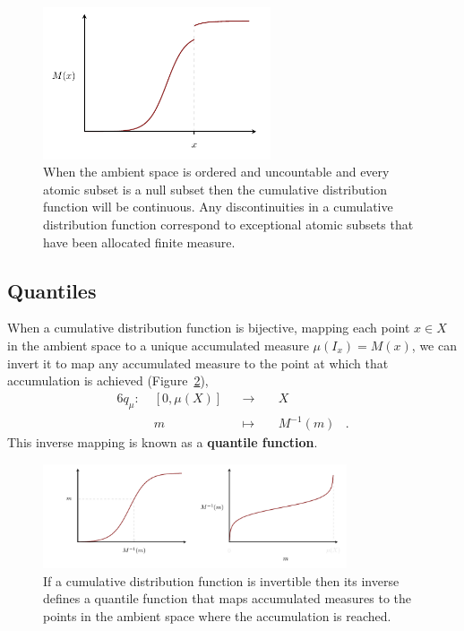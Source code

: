 \documentclass[
  letterpaper,
  DIV=11,
  numbers=noendperiod]{scrartcl}
\begin{document}
\begin{figure}

{\centering \includegraphics[width=0.6\textwidth,height=\textheight]{figures/cdfs/jump/jump.pdf}

}

\caption{\label{fig-cdf-jump}When the ambient space is ordered and
uncountable and every atomic subset is a null subset then the cumulative
distribution function will be continuous. Any discontinuities in a
cumulative distribution function correspond to exceptional atomic
subsets that have been allocated finite measure.}

\end{figure}

\hypertarget{quantiles}{%
\subsection{Quantiles}\label{quantiles}}

When a cumulative distribution function is bijective, mapping each point
\(x \in X\) in the ambient space to a unique accumulated measure
\(\mu(I_{x}) = M(x)\), we can invert it to map any accumulated measure
to the point at which that accumulation is achieved
(Figure~\ref{fig-quantile-function}), \begin{alignat*}{6}
q_{\mu} :\; & [0, \mu(X)] & &\rightarrow& \; &X&
\\
& m & &\mapsto& & M^{-1}(m) &.
\end{alignat*} This inverse mapping is known as a \textbf{quantile
function}.

\begin{figure}

{\centering \includegraphics[width=0.8\textwidth,height=\textheight]{figures/quantiles/quantile_function/quantile_function.pdf}

}

\caption{\label{fig-quantile-function}If a cumulative distribution
function is invertible then its inverse defines a quantile function that
maps accumulated measures to the points in the ambient space where the
accumulation is reached.}

\end{figure}
\end{document}
